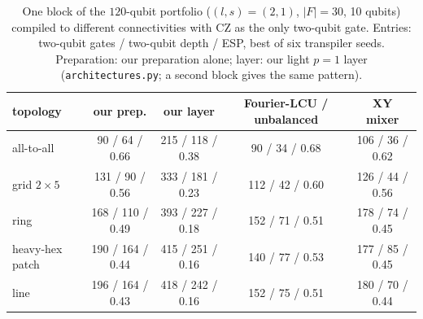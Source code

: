 \begin{table}[t]\centering\scriptsize\setlength{\tabcolsep}{3pt}
\caption{ One block of the $120$-qubit portfolio ($(l,s)=(2,1)$, $|F|=30$, 10 qubits) compiled to different connectivities with CZ as the only two-qubit gate. Entries: two-qubit gates / two-qubit depth / ESP, best of six transpiler seeds. Preparation: our preparation alone; layer: our light $p=1$ layer (\texttt{architectures.py}; a second block gives the same pattern).}\label{tab:arch}
\begin{tabular}{lcccc}\toprule
topology & our prep. & our layer & Fourier-LCU / unbalanced & XY mixer\\
\midrule
all-to-all & 90 / 64 / 0.66 & 215 / 118 / 0.38 & 90 / 34 / 0.68 & 106 / 36 / 0.62\\
grid $2{\times}5$ & 131 / 90 / 0.56 & 333 / 181 / 0.23 & 112 / 42 / 0.60 & 126 / 44 / 0.56\\
ring & 168 / 110 / 0.49 & 393 / 227 / 0.18 & 152 / 71 / 0.51 & 178 / 74 / 0.45\\
heavy-hex patch & 190 / 164 / 0.44 & 415 / 251 / 0.16 & 140 / 77 / 0.53 & 177 / 85 / 0.45\\
line & 196 / 164 / 0.43 & 418 / 242 / 0.16 & 152 / 75 / 0.51 & 180 / 70 / 0.44\\
\bottomrule\end{tabular}\end{table}
